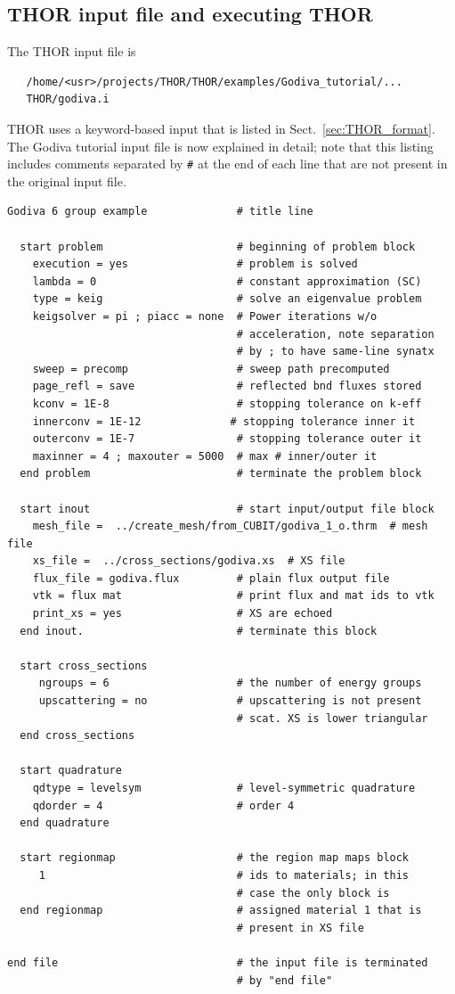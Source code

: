 \subsection{THOR input file and executing THOR}
The THOR input file is
\begin{verbatim}
   /home/<usr>/projects/THOR/THOR/examples/Godiva_tutorial/...
   THOR/godiva.i
\end{verbatim}
THOR uses a keyword-based input that is listed in Sect.~\ref{sec:THOR_format}. The Godiva tutorial input file is now explained in detail; note that this listing includes comments separated by \verb"#" at the end of each line that are not present in the original input file.
\begin{verbatim}
Godiva 6 group example              # title line

  start problem                     # beginning of problem block
    execution = yes                 # problem is solved
    lambda = 0                      # constant approximation (SC)
    type = keig                     # solve an eigenvalue problem
    keigsolver = pi ; piacc = none  # Power iterations w/o
                                    # acceleration, note separation
                                    # by ; to have same-line synatx
    sweep = precomp                 # sweep path precomputed
    page_refl = save                # reflected bnd fluxes stored
    kconv = 1E-8                    # stopping tolerance on k-eff
    innerconv = 1E-12              # stopping tolerance inner it
    outerconv = 1E-7                # stopping tolerance outer it
    maxinner = 4 ; maxouter = 5000  # max # inner/outer it
  end problem                       # terminate the problem block

  start inout                       # start input/output file block
    mesh_file =  ../create_mesh/from_CUBIT/godiva_1_o.thrm  # mesh file
    xs_file =  ../cross_sections/godiva.xs  # XS file
    flux_file = godiva.flux         # plain flux output file
    vtk = flux mat                  # print flux and mat ids to vtk
    print_xs = yes                  # XS are echoed
  end inout.                        # terminate this block

  start cross_sections
     ngroups = 6                    # the number of energy groups
     upscattering = no              # upscattering is not present
                                    # scat. XS is lower triangular
  end cross_sections

  start quadrature
    qdtype = levelsym               # level-symmetric quadrature
    qdorder = 4                     # order 4
  end quadrature

  start regionmap                   # the region map maps block
     1                              # ids to materials; in this
                                    # case the only block is
  end regionmap                     # assigned material 1 that is
                                    # present in XS file

end file                            # the input file is terminated
                                    # by "end file"
\end{verbatim}

